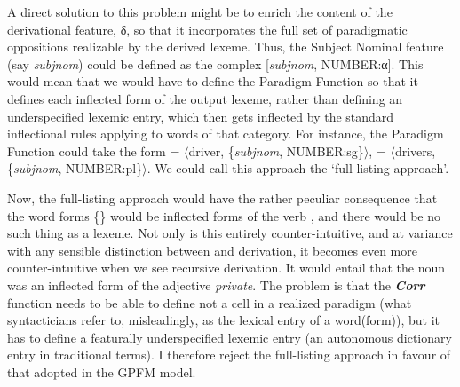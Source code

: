 \documentclass[output=paper,
modfonts
]{LSP/langsci}
\begin{document}
A direct solution to this problem might be to enrich the content of the derivational feature, δ, so that it incorporates the full set of paradigmatic oppositions realizable by the derived lexeme. Thus, the Subject Nominal feature (say \textit{subjnom}) could be defined as the complex [\textit{subjnom}, NUMBER:α]. This would mean that we would have to define the Paradigm Function so that it defines each inflected form of the output lexeme, rather than defining an underspecified lexemic entry, which then gets inflected by the standard inflectional rules applying to words of that category. For instance, the Paradigm Function could take the form  = $\langle$driver, \{\textit{subjnom}, NUMBER:sg\}$\rangle$,  = $\langle$drivers, \{\textit{subjnom}, NUMBER:pl\}$\rangle$. We could call this approach the ‘full-listing approach’.


Now, the full-listing approach would have the rather peculiar consequence that the word forms \{\} would be inflected forms of the verb , and there would be no such thing as a  lexeme. Not only is this entirely counter-intuitive, and at variance with any sensible distinction between  and derivation, it becomes even more counter-intuitive when we see recursive derivation. It would entail that the noun  was an inflected form of the adjective \textit{private}. The problem is that the \textbf{\textit{Corr}} function needs to be able to define not a cell in a realized paradigm (what syntacticians  refer to, misleadingly, as the lexical entry of a word(form)), but it has to define a featurally underspecified lexemic entry (an autonomous dictionary entry in traditional terms). I therefore reject the full-listing approach in favour of that adopted in the GPFM model. 
\end{document}
